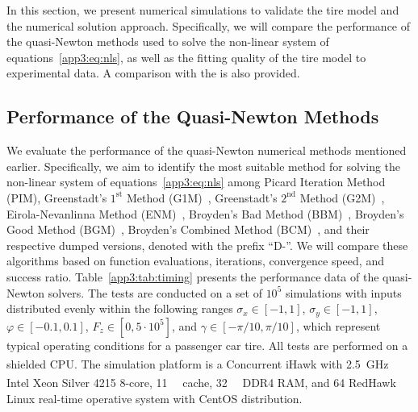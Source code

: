In this section, we present numerical simulations to validate the tire model and the numerical solution approach. Specifically, we will compare the performance of the quasi-Newton methods used to solve the non-linear system of equations~\eqref{app3:eq:nls}, as well as the fitting quality of the tire model to experimental data. A comparison with the \MagicFormulae{} is also provided.

\subsection{Performance of the Quasi-Newton Methods}

We evaluate the performance of the quasi-Newton numerical methods mentioned earlier. Specifically, we aim to identify the most suitable method for solving the non-linear system of equations~\eqref{app3:eq:nls} among Picard Iteration Method (PIM), Greenstadt's $1^\text{st}$ Method (G1M)~\cite{spedicato1978some}, Greenstadt's $2^\text{nd}$ Method (G2M)~\cite{spedicato1978some}, Eirola-Nevanlinna Method (ENM)~\cite{eirola1989accelerating}, Broyden's Bad Method (BBM)~\cite{broyden1965class},
Broyden's Good Method (BGM)~\cite{broyden1965class}, Broyden's Combined Method (BCM)~\cite{martinez1982sobre},
%
%
and their respective dumped versions, denoted with the prefix ``D-''. We will compare these algorithms based on function evaluations, iterations, convergence speed, and success ratio. Table~\ref{app3:tab:timing} presents the performance data of the quasi-Newton solvers. The tests are conducted on a set of $10^5$ simulations with inputs distributed evenly within the following ranges $\sigma_x\in[-1,1]$, $\sigma_y\in[-1,1]$, $\varphi\in[-0.1,0.1]$, $F_z\in[0,5\cdot10^5]$, and $\gamma \in [-\pi/10, \pi/10]$, which represent typical operating conditions for a passenger car tire. All tests are performed on a shielded CPU. The simulation platform is a Concurrent\textsuperscript{\textregistered} iHawk\textsuperscript{\texttrademark} with \SI{2.5}{\giga\hertz} Intel\textsuperscript{\textregistered} Xeon\textsuperscript{\textregistered} Silver 4215 8-core, \SI{11}{\mega\byte} cache, \SI{32}{\giga\byte} DDR4 \ac{RAM}, and \SI{64}{\bit} RedHawk\textsuperscript{\texttrademark} Linux real-time operative system with CentOS distribution.

